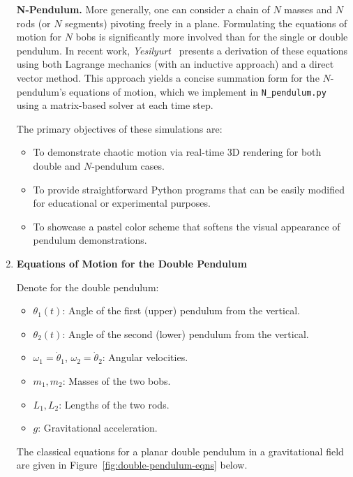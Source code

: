 \documentclass[letterpaper,12pt]{article}
\begin{document}
\begin{enumerate}[leftmargin=*, itemsep=1em]
\textbf{N-Pendulum.} More generally, one can consider a chain of $N$ masses and $N$ rods (or $N$ segments) pivoting freely in a plane. Formulating the equations of motion for $N$ bobs is significantly more involved than for the single or double pendulum. In recent work, \textit{Yesilyurt}~\cite{yesilyurt2020equationsmotionformulationpendulum} presents a derivation of these equations using both Lagrange mechanics (with an inductive approach) and a direct vector method. This approach yields a concise summation form for the $N$-pendulum’s equations of motion, which we implement in \texttt{N\_pendulum.py} using a matrix-based solver at each time step.

The primary objectives of these simulations are:
\begin{itemize}
    \item To demonstrate chaotic motion via real-time 3D rendering for both double and $N$-pendulum cases.
    \item To provide straightforward Python programs that can be easily modified for educational or experimental purposes.
    \item To showcase a pastel color scheme that softens the visual appearance of pendulum demonstrations.
\end{itemize}

\item \textbf{Equations of Motion for the Double Pendulum}
\label{sec:equations}

Denote for the double pendulum:
\begin{itemize}
    \item $\theta_1(t)$: Angle of the first (upper) pendulum from the vertical.
    \item $\theta_2(t)$: Angle of the second (lower) pendulum from the vertical.
    \item $\omega_1 = \dot{\theta}_1$, $\omega_2 = \dot{\theta}_2$: Angular velocities.
    \item $m_1, m_2$: Masses of the two bobs.
    \item $L_1, L_2$: Lengths of the two rods.
    \item $g$: Gravitational acceleration.
\end{itemize}

The classical equations for a planar double pendulum in a gravitational field are given in
Figure~\ref{fig:double-pendulum-eqns} below.


\end{enumerate}
\end{document}
